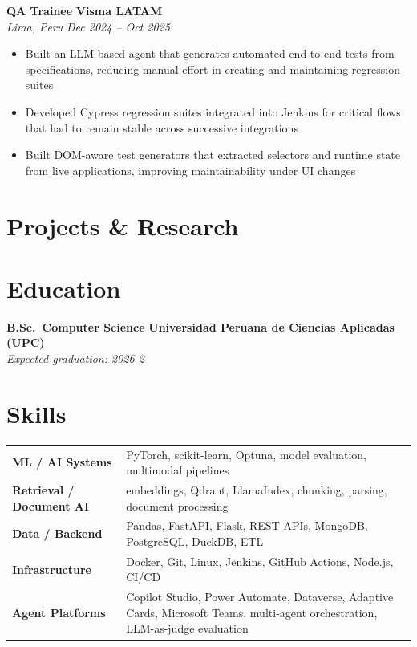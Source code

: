 \documentclass[a4paper,10pt]{article}
\providecommand{\projectssectionfile}{sections/projects.en.tex}
\begin{document}
\vspace{2pt}

\textbf{QA Trainee} \hfill \textbf{Visma LATAM}\\
\textit{Lima, Peru} \hfill \textit{Dec 2024 -- Oct 2025}
\begin{itemize}[leftmargin=1.2em, itemsep=1pt, topsep=2pt]
  \item Built an LLM-based agent that generates automated end-to-end tests from specifications, reducing manual effort in creating and maintaining regression suites
  \item Developed Cypress regression suites integrated into Jenkins for critical flows that had to remain stable across successive integrations
  \item Built DOM-aware test generators that extracted selectors and runtime state from live applications, improving maintainability under UI changes
\end{itemize}

\section*{Projects \& Research}


\section*{Education}

\textbf{B.Sc.\ Computer Science} \hfill \textbf{Universidad Peruana de Ciencias Aplicadas (UPC)}\\
\textit{Expected graduation: 2026-2}

\section*{Skills}

\begin{tabular}{@{} l l @{}}
  \textbf{ML / AI Systems} & PyTorch, scikit-learn, Optuna, model evaluation, multimodal pipelines \\
  \textbf{Retrieval / Document AI} & embeddings, Qdrant, LlamaIndex, chunking, parsing, document processing \\
  \textbf{Data / Backend} & Pandas, FastAPI, Flask, REST APIs, MongoDB, PostgreSQL, DuckDB, ETL \\
  \textbf{Infrastructure} & Docker, Git, Linux, Jenkins, GitHub Actions, Node.js, CI/CD \\
  \textbf{Agent Platforms} & Copilot Studio, Power Automate, Dataverse, Adaptive Cards, Microsoft Teams, multi-agent orchestration, LLM-as-judge evaluation \\
\end{tabular}
\end{document}
